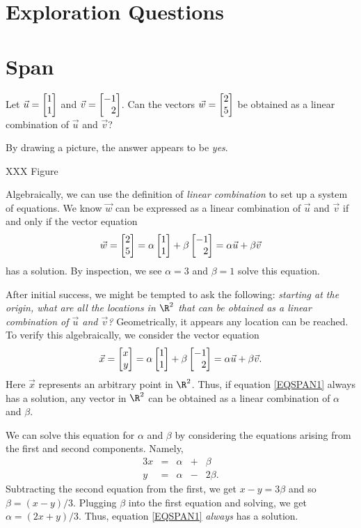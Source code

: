 \newpage
\section*{Exploration Questions}

\section{Span}

Let $\vec u=\mat{1\\1}$ and $\vec v=\mat{-1\\2}$. Can the vectors $\vec w=\mat{2\\5}$ be obtained
as a linear combination of $\vec u$ and $\vec v$?

By drawing a picture, the answer appears to be \emph{yes}.

XXX Figure

Algebraically, we can use the definition of \emph{linear combination} to set up a system of equations.
We know $\vec w$ can be expressed as a linear combination of $\vec u$ and $\vec v$ if and only if 
the vector equation
\[
	\vec w = \mat{2\\5}=\alpha\mat{1\\1}+\beta\mat{-1\\2}=\alpha \vec u+\beta \vec v
\]
has a solution. By inspection, we see $\alpha=3$ and $\beta=1$ solve this equation.

After initial success, we might be tempted to ask the following:
\emph{starting at the origin, what are all the locations in $\R^2$ that can be obtained
as a linear combination of $\vec u$ and $\vec v$?} Geometrically, it appears
any location can be reached. To verify this algebraically, we consider the vector equation
\begin{equation}
	\label{EQSPAN1}
	\vec x=\mat{x\\y} = \alpha\mat{1\\1}+\beta\mat{-1\\2} = \alpha\vec u+\beta\vec v.
\end{equation}
Here $\vec x$ represents an arbitrary point in $\R^2$. Thus, if equation \eqref{EQSPAN1} always
has a solution, any vector in $\R^2$ can be obtained as a linear combination of $\alpha$ and $\beta$.

We can solve this equation for $\alpha$ and $\beta$ by considering the equations arising from the
first and second components. Namely,
\begin{alignat*}{3}
	x &{}={}& \alpha &{}+{}& \beta\\
	y &{}={}& \alpha &{}-{}& 2\beta.
\end{alignat*}
Subtracting the second equation from the first, we get $x-y=3\beta$ and so $\beta=(x-y)/3$. Plugging 
$\beta$ into the first equation and solving, we get $\alpha=(2x+y)/3$. Thus, equation \eqref{EQSPAN1}
\emph{always} has a solution.

